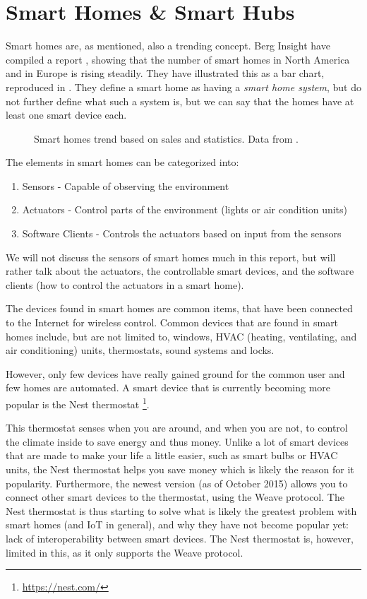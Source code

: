 \section{Smart Homes \& Smart Hubs}\label{sec:smarthomes}
Smart homes are, as mentioned, also a trending concept. 
Berg Insight have compiled a report \cite{SMARTHOMETREND}, 
showing that the number of smart homes in North America and in Europe is rising steadily. 
They have illustrated this as a bar chart, reproduced in .
They define a smart home as having a \emph{smart home system}, 
but do not further define what such a system is, 
but we can say that the homes have at least one smart device each. 

\begin{figure}[!htb]
  \centering
  
  \caption{Smart homes trend based on sales and statistics. Data from \protect\cite{SMARTHOMETREND}.}
  \label{fig:smarthomestrend}
\end{figure}

The elements in smart homes can be categorized into:
\begin{enumerate}
  \item Sensors - Capable of observing the environment
  \item Actuators - Control parts of the environment (\eg lights or air condition units)
  \item Software Clients - Controls the actuators based on input from the sensors
\end{enumerate}

We will not discuss the sensors of smart homes much in this report, 
but will rather talk about the actuators, 
\ie the controllable smart devices,
and the software clients (how to control the actuators in a smart home).

The devices found in smart homes are common items, 
that have been connected to the Internet for wireless control.
Common devices that are found in smart homes include, but are not limited to, 
windows, HVAC (heating, ventilating, and air conditioning) units, thermostats, sound systems and locks. 

However, only few devices have really gained ground for the common user and few homes are automated.
A smart device that is currently becoming more popular is the Nest thermostat \footnote{\url{https://nest.com/}}. 

This thermostat senses when you are around, and when you are not, 
to control the climate inside to save energy and thus money.
Unlike a lot of smart devices that are made to make your life a little easier, such as smart bulbs or HVAC units,
the Nest thermostat helps you save money which is likely the reason for it popularity. 
Furthermore, the newest version (as of October 2015) allows you to connect other smart devices to the thermostat, 
using the Weave protocol. 
The Nest thermostat is thus starting to solve what is likely the greatest problem with smart homes (and IoT in general), 
and why they have not become popular yet: lack of interoperability between smart devices. 
The Nest thermostat is, however, limited in this, 
as it only supports the Weave protocol. 

